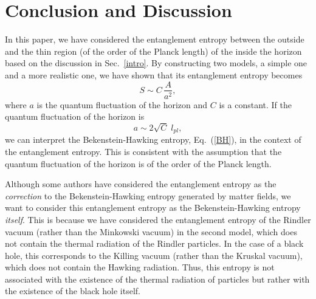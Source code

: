 \documentclass[12pt,epsf]{article}
\begin{document}
\section{Conclusion and Discussion}
\label{conclude}
In this paper, we have considered
the entanglement entropy between
the outside and the thin region
(of the order of the Planck length)
of the inside the horizon
based on the discussion in Sec.~\ref{intro}.
By constructing two models, a simple one and a more realistic one,
we have shown that its entanglement entropy becomes
\begin{equation}
 S\sim C\,\frac{A}{a^2},
\end{equation}
where $a$ is the quantum fluctuation of the horizon and
$C$ is a constant.
If the quantum fluctuation of the horizon is
\begin{equation}
  a \sim 2\sqrt{C}\; l_{pl},
\end{equation}
we can interpret the Bekenstein-Hawking entropy, Eq.~(\ref{BH}),
in the context of the entanglement entropy.
This is consistent with the assumption that
the quantum fluctuation of the horizon
is of the order of the Planck length.

Although some authors have considered
the entanglement entropy as the {\em correction} to
the Bekenstein-Hawking entropy generated by matter fields,
we want to consider this entanglement entropy
as the Bekenstein-Hawking entropy {\em itself}.
This is because we have considered the entanglement entropy
of the Rindler vacuum (rather than the Minkowski vacuum)
in the second model, which does not contain the thermal radiation
of the Rindler particles.
In the case of a black hole, 
this corresponds to the Killing vacuum
(rather than the Kruskal vacuum),
which does not contain the Hawking radiation.
Thus, this entropy is not associated with the existence
of the thermal radiation of particles
but rather with the existence of the black hole itself.
\end{document}
